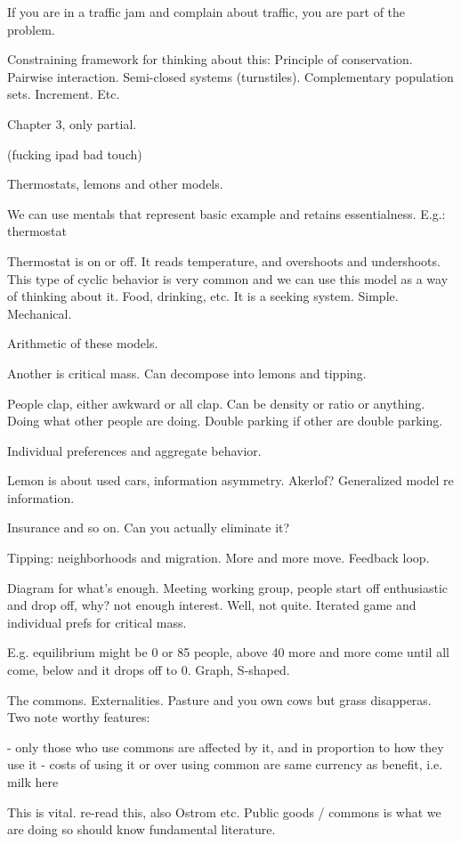 \documentclass[12pt]{report}
\begin{document}
If you are in a traffic jam and complain about traffic, you are part of the problem.

Constraining framework for thinking about this:
Principle of conservation. Pairwise interaction. Semi-closed systems
(turnstiles). Complementary population sets. Increment. Etc.

Chapter 3, only partial.

(fucking ipad bad touch)

Thermostats, lemons and other models.

We can use mentals that represent basic example and retains essentialness. E.g.: thermostat

Thermostat is on or off. It reads temperature, and overshoots and undershoots.
This type of cyclic behavior is very common and we can use this model as a way
of thinking about it. Food, drinking, etc. It is a seeking system. Simple. Mechanical.

Arithmetic of these models.

Another is critical mass. Can decompose into lemons and tipping.

People clap, either awkward or all clap. Can be density or ratio or anything.
Doing what other people are doing. Double parking if other are double parking.

Individual preferences and aggregate behavior.

Lemon is about used cars, information asymmetry. Akerlof? Generalized model re information.

Insurance and so on. Can you actually eliminate it?

Tipping: neighborhoods and migration. More and more move. Feedback loop.

Diagram for what's enough. Meeting working group, people start off enthusiastic
and drop off, why? not enough interest. Well, not quite. Iterated game and
individual prefs for critical mass.

E.g. equilibrium might be 0 or 85 people, above 40 more and more come until all
come, below and it drops off to 0. Graph, S-shaped.

The commons. Externalities. Pasture and you own cows but grass disapperas. Two note worthy features:

- only those who use commons are affected by it, and in proportion to how they use it
- costs of using it or over using common are same currency as benefit, i.e. milk here

This is vital. re-read this, also Ostrom etc. Public goods / commons is what we
are doing so should know fundamental literature.
\end{document}
